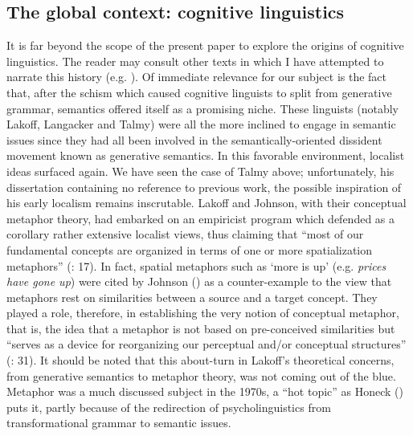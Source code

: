\documentclass[output=paper]{langscibook}
\begin{document}
\subsection{The global context: cognitive linguistics}

It is far beyond the scope of the present paper to explore the origins of cognitive linguistics. The reader may consult other texts in which I have attempted to narrate this history (e.g. \citealt{arigne_generative_2015}). Of immediate relevance for our subject is the fact that, after the schism which caused cognitive linguists to split from generative grammar, semantics offered itself as a promising niche. These linguists (notably Lakoff, Langacker and Talmy) were all the more inclined to engage in semantic issues since they had all been involved in the semantically-oriented dissident movement known as generative semantics. In this favorable environment, localist ideas surfaced again. We have seen the case of Talmy above; unfortunately, his dissertation containing no reference to previous work, the possible inspiration of his early localism remains inscrutable. Lakoff and Johnson, with their conceptual metaphor theory, had embarked on an empiricist program which defended as a corollary rather extensive localist views, thus claiming that “most of our fundamental concepts are organized in terms of one or more spatialization metaphors” (\citealt{lakoff_metaphors_1980}: 17). In fact, spatial metaphors such as ‘more is up’ (e.g. \textit{prices have gone up}) were cited by Johnson (\citeyear{johnson_introduction:_1981}) as a counter-example to the view that metaphors rest on similarities between a source and a target concept. They played a role, therefore, in establishing the very notion of conceptual metaphor, that is, the idea that a metaphor is not based on pre-conceived similarities but “serves as a device for reorganizing our perceptual and\slash or conceptual structures” (\citealt{johnson_introduction:_1981}: 31). It should be noted that this about-turn in Lakoff’s theoretical concerns, from generative semantics to metaphor theory, was not coming out of the blue. Metaphor was a much discussed subject in the 1970s, a “hot topic” as Honeck (\citeyear{honeck_historical_1980}) puts it, partly because of the redirection of psycholinguistics from transformational grammar to semantic issues.
\end{document}
